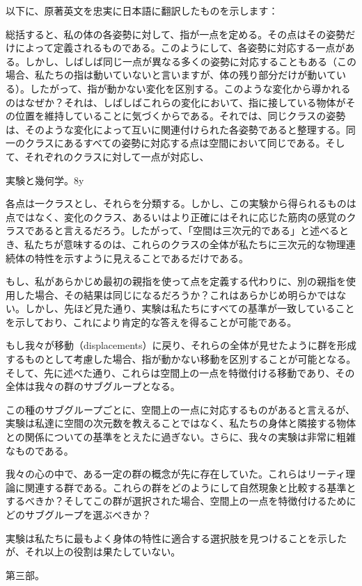 \documentclass[a4paper,11pt,openany]{ltjsbook}
\begin{document}
以下に、原著英文を忠実に日本語に翻訳したものを示します：

総括すると、私の体の各姿勢に対して、指が一点を定める。その点はその姿勢だけによって定義されるものである。このようにして、各姿勢に対応する一点がある。しかし、しばしば同じ一点が異なる多くの姿勢に対応することもある（この場合、私たちの指は動いていないと言いますが、体の残り部分だけが動いている）。したがって、指が動かない変化を区別する。このような変化から導かれるのはなぜか？それは、しばしばこれらの変化において、指に接している物体がその位置を維持していることに気づくからである。それでは、同じクラスの姿勢は、そのような変化によって互いに関連付けられた各姿勢であると整理する。同一のクラスにあるすべての姿勢に対応する点は空間において同じである。そして、それぞれのクラスに対して一点が対応し、

実験と幾何学。8y

各点は一クラスとし、それらを分類する。しかし、この実験から得られるものは点ではなく、変化のクラス、あるいはより正確にはそれに応じた筋肉の感覚のクラスであると言えるだろう。したがって、「空間は三次元的である」と述べるとき、私たちが意味するのは、これらのクラスの全体が私たちに三次元的な物理連続体の特性を示すように見えることであるだけである。

もし、私があらかじめ最初の親指を使って点を定義する代わりに、別の親指を使用した場合、その結果は同じになるだろうか？これはあらかじめ明らかではない。しかし、先ほど見た通り、実験は私たちにすべての基準が一致していることを示しており、これにより肯定的な答えを得ることが可能である。

もし我々が移動（displacements）に戻り、それらの全体が見せたように群を形成するものとして考慮した場合、指が動かない移動を区別することが可能となる。そして、先に述べた通り、これらは空間上の一点を特徴付ける移動であり、その全体は我々の群のサブグループとなる。

この種のサブグループごとに、空間上の一点に対応するものがあると言えるが、実験は私達に空間の次元数を教えることではなく、私たちの身体と隣接する物体との関係についての基準をとえたに過ぎない。さらに、我々の実験は非常に粗雑なものである。

我々の心の中で、ある一定の群の概念が先に存在していた。これらはリーティ理論に関連する群である。これらの群をどのようにして自然現象と比較する基準とするべきか？そしてこの群が選択された場合、空間上の一点を特徴付けるためにどのサブグループを選ぶべきか？

実験は私たちに最もよく身体の特性に適合する選択肢を見つけることを示したが、それ以上の役割は果たしていない。

第三部。
\end{document}
